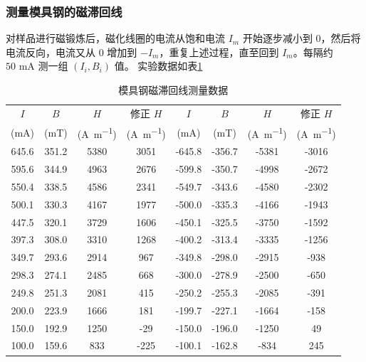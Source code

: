 \documentclass[11pt]{article}
\begin{document}
\subsubsection{测量模具钢的磁滞回线}

对样品进行磁锻炼后，磁化线圈的电流从饱和电流 $I_m$ 开始逐步减小到 0，然后将电流反向，电流又从 0 增加到 $-I_m$，重复上述过程，直至回到 $I_m$。每隔约 $50\text{ mA}$ 测一组 $(I_i, B_i)$ 值。
实验数据如表\ref{tab:hysteresis_loop}

\begin{table}[H]
    \centering
    \caption{模具钢磁滞回线测量数据}
    \label{tab:hysteresis_loop}
    \renewcommand{\arraystretch}{1.2} %
    \setlength{\tabcolsep}{3pt}       %
    \tiny                             %
    \begin{tabular}{cccccccc}
        \toprule
        $I$ & $B$ & $H$ & 修正 $H$ & $I$ & $B$ & $H$ & 修正 $H$ \\
        (\si{\milli\ampere}) & (\si{\milli\tesla}) & (\si{\ampere\per\meter}) & (\si{\ampere\per\meter}) & (\si{\milli\ampere}) & (\si{\milli\tesla}) & (\si{\ampere\per\meter}) & (\si{\ampere\per\meter}) \\
        \midrule
        645.6  & 351.2 & 5380 & 3051 & -645.8 & -356.7 & -5381 & -3016 \\
        595.6  & 344.9 & 4963 & 2676 & -599.8 & -350.7 & -4998 & -2672 \\
        550.4  & 338.5 & 4586 & 2341 & -549.7 & -343.6 & -4580 & -2302 \\
        500.1  & 330.3 & 4167 & 1977 & -500.0 & -335.3 & -4166 & -1943 \\
        447.5  & 320.1 & 3729 & 1606 & -450.1 & -325.5 & -3750 & -1592 \\
        397.3  & 308.0 & 3310 & 1268 & -400.2 & -313.4 & -3335 & -1256 \\
        349.7  & 293.6 & 2914 & 967  & -349.8 & -298.0 & -2915 & -938 \\
        298.3  & 274.1 & 2485 & 668  & -300.0 & -278.9 & -2500 & -650 \\
        249.8  & 251.3 & 2081 & 415  & -250.2 & -255.3 & -2085 & -391 \\
        200.0  & 223.9 & 1666 & 181  & -199.7 & -227.1 & -1664 & -158 \\
        150.0  & 192.9 & 1250 & -29  & -150.0 & -196.0 & -1250 & 49 \\
        100.0  & 159.6 & 833  & -225 & -100.1 & -162.8 & -834  & 245 \\

\end{tabular}
\end{table}
\end{document}
